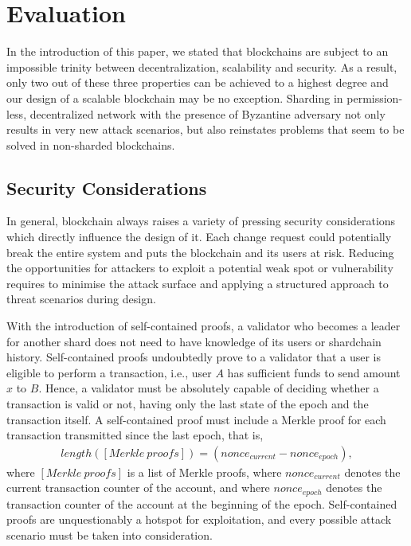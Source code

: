 
\chapter{Evaluation}
\label{Chapter:Evaluation}

In the introduction of this paper, we stated that blockchains are subject to an impossible trinity between decentralization, scalability and security. As a result, only two out of these three properties can be achieved to a highest degree and our design of a scalable blockchain may be no exception. Sharding in permission-less, decentralized network with the presence of Byzantine adversary not only results in very new attack scenarios, but also reinstates problems that seem to be solved in non-sharded blockchains.

\section{Security Considerations}
\label{Eval:SecurityConsiderations}

In general, blockchain always raises a variety of pressing security considerations which directly influence the design of it. Each change request could potentially break the entire system and puts the blockchain and its users at risk. Reducing the opportunities for attackers to exploit a potential weak spot or vulnerability requires to minimise the attack surface and applying a structured approach to threat scenarios during design. 

With the introduction of self-contained proofs, a validator who becomes a leader for another shard does not need to have knowledge of its users or shardchain history. Self-contained proofs undoubtedly prove to a validator that a user is eligible to perform a transaction, i.e., user $A$ has sufficient funds to send amount $x$ to $B$. Hence, a validator must be absolutely capable of deciding whether a transaction is valid or not, having only the last state of the epoch and the transaction itself. A self-contained proof must include a Merkle proof for each transaction transmitted since the last epoch, that is,
\begin{gather}
  \label{eq:NofMerkleProofs}
  length([Merkle\ proofs]) = (nonce_{current} - nonce_{epoch}),
\end{gather}
where $[Merkle\ proofs]$ is a list of Merkle proofs, where $nonce_{current}$ denotes the current transaction counter of the account, and where $nonce_{epoch}$ denotes the transaction counter of the account at the beginning of the epoch. Self-contained proofs are unquestionably a hotspot for exploitation, and every possible attack scenario must be taken into consideration.

